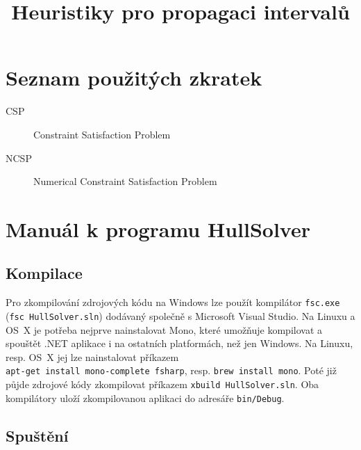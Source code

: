 \documentclass[thesis=B,czech]{FITthesis}[2012/06/26]
\title{Heuristiky pro propagaci intervalů}
\theoremstyle{definition}
\begin{document}

\begin{introduction}

\end{introduction}






\begin{conclusion}
\end{conclusion}




\appendix

\chapter{Seznam použitých zkratek}
\begin{description}
	\item[CSP] Constraint Satisfaction Problem
	\item[NCSP] Numerical Constraint Satisfaction Problem
\end{description}



\chapter{Manuál k programu HullSolver}
\label{hullSolverManual}
\section{Kompilace}
Pro zkompilování zdrojových kódu na Windows lze použít kompilátor \verb|fsc.exe| (\verb|fsc HullSolver.sln|) dodávaný společně s Microsoft Visual Studio. Na Linuxu a OS~X je potřeba nejprve nainstalovat Mono, které umožňuje kompilovat a spouštět .NET aplikace i na ostatních platformách, než jen Windows. Na Linuxu, resp. OS~X jej lze nainstalovat příkazem \\ \verb|apt-get install mono-complete fsharp|, resp. \verb|brew install mono|. Poté již půjde zdrojové kódy zkompilovat příkazem \verb|xbuild HullSolver.sln|. Oba kompilátory uloží zkompilovanou aplikaci do adresáře \verb|bin/Debug|.

\section{Spuštění}
\end{document}
